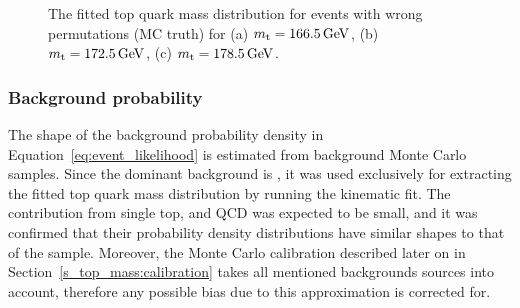 \begin{figure}[!htpb]
\begin{center}
	\hfill
	\caption{\label{fig:fitted_ttbar_wp_density}
	The fitted top quark mass distribution for \ttbar events with wrong permutations (MC truth) for (a)
	$\mtop=\SI{166.5}{\GeV}$, (b) $\mtop=\SI{172.5}{\GeV}$, (c) $\mtop=\SI{178.5}{\GeV}$.}
\end{center}
\end{figure}

\subsubsection*{Background probability}

The shape of the background probability density in Equation~\ref{eq:event_likelihood} is estimated from background Monte
Carlo samples. Since the dominant background is \WpJets, it was used exclusively for extracting the fitted top quark
mass distribution by running the kinematic fit. The contribution from single top, \ZpJets and QCD was expected to be
small, and it was confirmed that their probability density distributions have similar shapes to that of the \WpJets
sample. Moreover, the Monte Carlo calibration described later on in Section~\ref{s_top_mass:calibration} takes all
mentioned backgrounds sources into account, therefore any possible bias due to this approximation is corrected for.

